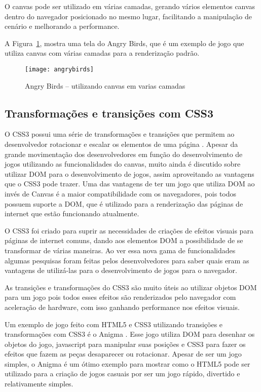 O canvas pode ser utilizado em várias camadas, gerando vários
elementos canvas dentro do navegador posicionado no mesmo
lugar, facilitando a manipulação de cenário e melhorando a
performance.

A Figura~\ref{img:angrybirds}, mostra uma tela do Angry Birds, que é um exemplo de jogo
que utiliza canvas com várias camadas para a renderização padrão.

\newlength{\imgwidth}
\setlength{\imgwidth}{16.09cm}
\newlength{\imgheight}
\setlength{\imgheight}{10.59cm}

\begin{figure}[H]
  \centering
	\texttt{[image: angrybirds]}
  \caption{Angry Birds {--} utilizando canvas em varias camadas}
  \label{img:angrybirds}
\end{figure}


\subsection{Transformações e transições com CSS3}

O CSS3 possui uma série de transformações e transições que permitem ao
desenvolvedor rotacionar e escalar os elementos de uma página
\cite{agi2011html5}. Apesar da grande movimentação dos desenvolvedores
em função do desenvolvimento de jogos utilizando as funcionalidades do
canvas, muito ainda é discutido sobre utilizar DOM para o
desenvolvimento de jogos, assim aproveitando as vantagens que o CSS3
pode trazer.
Uma das vantagens de ter um jogo que utiliza DOM ao invés de Canvas é
a maior compatibilidade com os navegadores, pois todos possuem suporte
a DOM, que é utilizado para a renderização das páginas de internet que
estão funcionando atualmente.

O CSS3 foi criado para suprir as necessidades de criações de efeitos
visuais para páginas de internet comuns, dando aos elementos DOM a
possibilidade de se transformar de várias maneiras. Ao ver essa nova
gama de funcionalidades algumas pesquisas foram feitas pelos
desenvolvedores para saber quais eram as vantagens de utilizá-las para
o desenvolvimento de jogos para o navegador.

As transições e transformações do CSS3 são muito úteis ao utilizar
objetos DOM para um jogo pois todos esses efeitos são renderizados
pelo navegador com aceleração de hardware, com isso ganhando
performance nos efeitos visuais.

Um exemplo de jogo feito com HTML5 e CSS3 utilizando transições e
transformações com CSS3 é o Anigma \cite{website:anigma}. Esse jogo
utiliza DOM para desenhar os objetos do jogo, javascript para
manipular suas posições e CSS3 para fazer os efeitos que fazem as
peças desaparecer ou rotacionar. Apesar de ser um jogo simples, o
Anigma é um ótimo exemplo para mostrar como o HTML5 pode ser utilizado
para a criação de jogos casuais por ser um jogo rápido, divertido e
relativamente simples.

